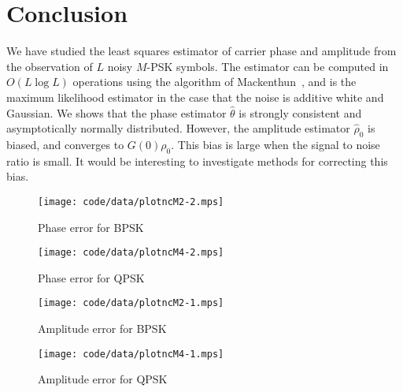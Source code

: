 \documentclass[conference]{IEEEtran}
\begin{document}


\section{Conclusion}

We have studied the least squares estimator of carrier phase and amplitude from the observation of $L$ noisy $M$-PSK symbols.  The estimator can be computed in $O(L\log L)$ operations using the algorithm of Mackenthun~\cite{Mackenthun1994}, and is the maximum likelihood estimator in the case that the noise is additive white and Gaussian.  We shows that the phase estimator $\hat{\theta}$ is strongly consistent and asymptotically normally distributed.  However, the amplitude estimator $\hat{\rho}_0$ is biased, and converges to $G(0)\rho_0$.  This bias is large when the signal to noise ratio is small.  It would be interesting to investigate methods for correcting this bias. 

\small



\begin{figure}[p]
	\centering
		\texttt{[image: code/data/plotncM2-2.mps]}
		\caption{Phase error for BPSK}
		\label{fig:plotphaseM2}
\end{figure}

\begin{figure}[p]
	\centering
		\texttt{[image: code/data/plotncM4-2.mps]}
		\caption{Phase error for QPSK}
		\label{fig:plotphaseM4}
\end{figure}

\begin{figure}[p]
	\centering
		\texttt{[image: code/data/plotncM2-1.mps]}
		\caption{Amplitude error for BPSK}
		\label{fig:plotampM2}
\end{figure}

\begin{figure}[p]
	\centering
		\texttt{[image: code/data/plotncM4-1.mps]}
		\caption{Amplitude error for QPSK}
		\label{fig:plotampM}
\end{figure}

\end{document}

